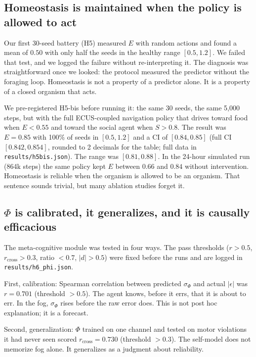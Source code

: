 \documentclass[11pt,a4paper]{article}
\begin{document}
\subsection{Homeostasis is maintained when the policy is allowed to act}

Our first 30-seed battery (H5) measured $E$ with random actions and found a mean of $0.50$ with only half the seeds in the healthy range $[0.5, 1.2]$. We failed that test, and we logged the failure without re-interpreting it. The diagnosis was straightforward once we looked: the protocol measured the predictor without the foraging loop. Homeostasis is not a property of a predictor alone. It is a property of a closed organism that acts.

We pre-registered H5-bis before running it: the same 30 seeds, the same 5,000 steps, but with the full ECUS-coupled navigation policy that drives toward food when $E<0.55$ and toward the social agent when $S>0.8$. The result was $E=0.85$ with 100\% of seeds in $[0.5,1.2]$ and a CI of $[0.84,0.85]$ (full CI $[0.842,0.854]$, rounded to 2 decimals for the table; full data in \texttt{results/h5bis.json}). The range was $[0.81,0.88]$. In the 24-hour simulated run (864k steps) the same policy kept $E$ between $0.66$ and $0.84$ without intervention. Homeostasis is reliable when the organism is allowed to be an organism. That sentence sounds trivial, but many ablation studies forget it.

\subsection{\texorpdfstring{$\Phi$}{Phi} is calibrated, it generalizes, and it is causally efficacious}

The meta-cognitive module was tested in four ways. The pass thresholds ($r>0.5$, $r_{\mathrm{cross}}>0.3$, ratio $<0.7$, $|d|>0.5$) were fixed before the runs and are logged in \texttt{results/h6\_phi.json}.

First, calibration: Spearman correlation between predicted $\sigma_\Phi$ and actual $|\epsilon|$ was $r=0.701$ (threshold $>0.5$). The agent knows, before it errs, that it is about to err. In the fog, $\sigma_\Phi$ rises before the raw error does. This is not post hoc explanation; it is a forecast.

Second, generalization: $\Phi$ trained on one channel and tested on motor violations it had never seen scored $r_{\mathrm{cross}}=0.730$ (threshold $>0.3$). The self-model does not memorize fog alone. It generalizes as a judgment about reliability.
\end{document}
